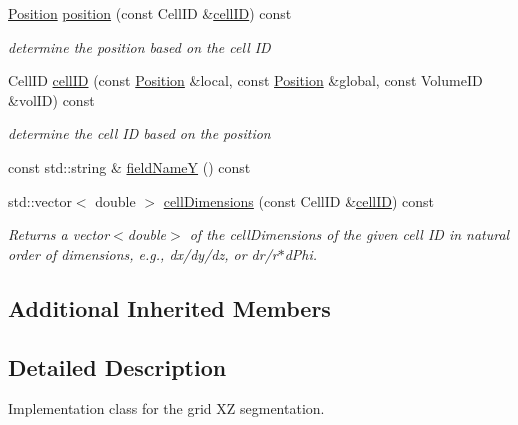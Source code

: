 \begin{DoxyCompactItemize}
\hyperlink{namespace_d_d4hep_1_1_geometry_a55083902099d03506c6db01b80404900}{Position} \hyperlink{class_d_d4hep_1_1_geometry_1_1_multi_segmentation_a4876e40635f9504329070cd252a1e9a2}{position} (const Cell\+ID \&\hyperlink{class_d_d4hep_1_1_geometry_1_1_multi_segmentation_a45e00a1c691bffc87fed338dc2470717}{cell\+ID}) const
\begin{DoxyCompactList}\small\item\em determine the position based on the cell ID \end{DoxyCompactList}\item 
Cell\+ID \hyperlink{class_d_d4hep_1_1_geometry_1_1_multi_segmentation_a45e00a1c691bffc87fed338dc2470717}{cell\+ID} (const \hyperlink{namespace_d_d4hep_1_1_geometry_a55083902099d03506c6db01b80404900}{Position} \&local, const \hyperlink{namespace_d_d4hep_1_1_geometry_a55083902099d03506c6db01b80404900}{Position} \&global, const Volume\+ID \&vol\+ID) const
\begin{DoxyCompactList}\small\item\em determine the cell ID based on the position \end{DoxyCompactList}\item 
const std\+::string \& \hyperlink{class_d_d4hep_1_1_geometry_1_1_multi_segmentation_a16553323d3de4390dd8492034485e503}{field\+NameY} () const
\item 
std\+::vector$<$ double $>$ \hyperlink{class_d_d4hep_1_1_geometry_1_1_multi_segmentation_a1d1710e18a8c00b557418338a5d1414e}{cell\+Dimensions} (const Cell\+ID \&\hyperlink{class_d_d4hep_1_1_geometry_1_1_multi_segmentation_a45e00a1c691bffc87fed338dc2470717}{cell\+ID}) const
\begin{DoxyCompactList}\small\item\em Returns a vector$<$double$>$ of the cell\+Dimensions of the given cell ID in natural order of dimensions, e.\+g., dx/dy/dz, or dr/r$\ast$d\+Phi. \end{DoxyCompactList}\end{DoxyCompactItemize}
\subsection*{Additional Inherited Members}


\subsection{Detailed Description}
Implementation class for the grid XZ segmentation. 

